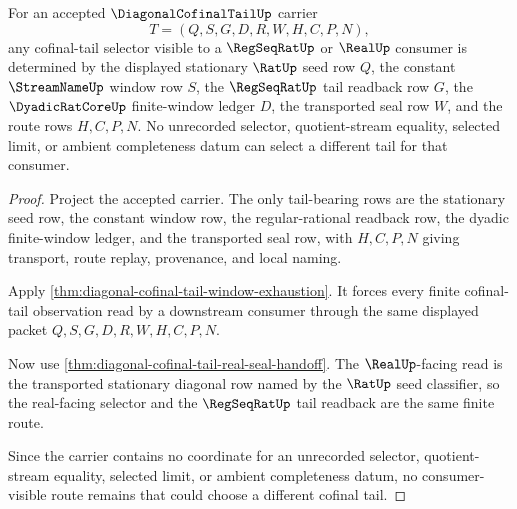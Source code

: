 \begin{theorem}
\label{thm:diagonal-cofinal-tail-tail-selector-lock}
For an accepted $\DiagonalCofinalTailUp$ carrier
$$
T=(Q,S,G,D,R,W,H,C,P,N),
$$
any cofinal-tail selector visible to a $\RegSeqRatUp$ or $\RealUp$ consumer is determined by the displayed stationary $\RatUp$ seed row $Q$, the constant $\StreamNameUp$ window row $S$, the $\RegSeqRatUp$ tail readback row $G$, the $\DyadicRatCoreUp$ finite-window ledger $D$, the transported seal row $W$, and the route rows $H,C,P,N$. No unrecorded selector, quotient-stream equality, selected limit, or ambient completeness datum can select a different tail for that consumer.
\end{theorem}
\begin{proof}
Project the accepted carrier. The only tail-bearing rows are the stationary seed row, the constant window row, the regular-rational readback row, the dyadic finite-window ledger, and the transported seal row, with $H,C,P,N$ giving transport, route replay, provenance, and local naming.

Apply \autoref{thm:diagonal-cofinal-tail-window-exhaustion}. It forces every finite cofinal-tail observation read by a downstream consumer through the same displayed packet $Q,S,G,D,R,W,H,C,P,N$.

Now use \autoref{thm:diagonal-cofinal-tail-real-seal-handoff}. The $\RealUp$-facing read is the transported stationary diagonal row named by the $\RatUp$ seed classifier, so the real-facing selector and the $\RegSeqRatUp$ tail readback are the same finite route.

Since the carrier contains no coordinate for an unrecorded selector, quotient-stream equality, selected limit, or ambient completeness datum, no consumer-visible route remains that could choose a different cofinal tail.
\end{proof}


